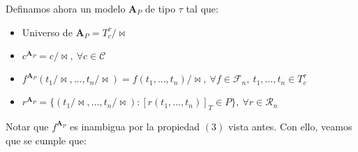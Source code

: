 \documentclass{article}
\begin{document}
\vspace{0.3cm}
Definamos ahora un modelo $\mathbf{A}_P$ de tipo $\tau$ tal que:
\begin{itemize}
  \item Universo de $\mathbf{A}_P=T^\tau_c/\!\bowtie$
  \item $c^{\mathbf{A}_P}=c/\!\bowtie,\ \forall c\in\mathcal{C}$
  \item $f^{\mathbf{A}_P}(t_1/\!\bowtie,\dots,t_n/\!\bowtie)=f(t_1,\dots,t_n)/\!\bowtie,\ \forall f\in\mathcal{F}_n,\ t_1,\dots,t_n\in T^\tau_c$
  \item $r^{\mathbf{A}_P}=\{(t_1/\!\bowtie,\dots,t_n/\!\bowtie):[r(t_1,\dots,t_n)]_T\in P\},\ \forall r\in\mathcal{R}_n$
\end{itemize}
Notar que $f^{\mathbf{A}_P}$ es inambigua por la propiedad $(3)$ vista antes. Con ello, veamos que se cumple que:
\end{document}
